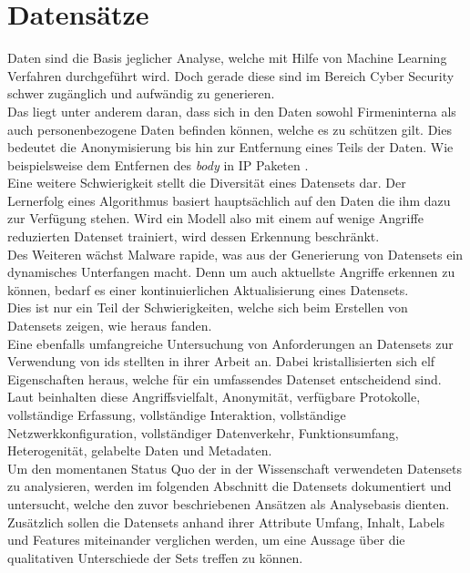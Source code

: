 \documentclass[
    12pt, %
    DIV10,
    ngerman, %
    a4paper, %
    oneside, %
    titlepage, %
    parskip=half, %
    headings=normal, %
    listof=totoc, %
    bibliography=totoc, %
    index=totoc, %
    captions=tableheading, %
    final %
]{scrreprt}
\begin{document}
\chapter{Datensätze}
Daten sind die Basis jeglicher Analyse, welche mit Hilfe von Machine Learning Verfahren durchgeführt wird. Doch gerade diese sind im Bereich Cyber Security schwer zugänglich und aufwändig zu generieren.\\ 
Das liegt unter anderem daran, dass sich in den Daten sowohl Firmeninterna als auch personenbezogene Daten befinden können, welche es zu schützen gilt. Dies bedeutet die Anonymisierung bis hin zur Entfernung eines Teils der Daten. Wie beispielsweise dem Entfernen des \emph{body} in IP Paketen \parencite{Uramova2018}.\\
Eine weitere Schwierigkeit stellt die Diversität eines Datensets dar. Der Lernerfolg eines Algorithmus basiert hauptsächlich auf den Daten die ihm dazu zur Verfügung stehen. Wird ein Modell also mit einem auf wenige Angriffe reduzierten Datenset trainiert, wird dessen Erkennung beschränkt.\\
Des Weiteren wächst Malware rapide, was aus der Generierung von Datensets ein dynamisches Unterfangen macht. Denn um auch aktuellste Angriffe erkennen zu können, bedarf es einer kontinuierlichen Aktualisierung eines Datensets.\\
Dies ist nur ein Teil der Schwierigkeiten, welche sich beim Erstellen von Datensets zeigen, wie \textcite{Uramova2018} heraus fanden.\\
Eine ebenfalls umfangreiche Untersuchung von Anforderungen an Datensets zur Verwendung von \ac{ids} stellten \textcite{7885840} in ihrer Arbeit an. Dabei kristallisierten sich elf  Eigenschaften heraus, welche für ein umfassendes Datenset entscheidend sind. Laut \citeauthor{7885840} beinhalten diese Angriffsvielfalt, Anonymität, verfügbare Protokolle, vollständige Erfassung,
vollständige Interaktion, vollständige Netzwerkkonfiguration, vollständiger Datenverkehr, Funktionsumfang, Heterogenität, gelabelte Daten und Metadaten.\\
Um den momentanen Status Quo der in der Wissenschaft verwendeten Datensets zu analysieren, werden im folgenden Abschnitt die Datensets dokumentiert und untersucht, welche den zuvor beschriebenen Ansätzen als Analysebasis dienten. Zusätzlich sollen die Datensets anhand ihrer Attribute Umfang, Inhalt, Labels und Features miteinander verglichen werden, um eine Aussage über die qualitativen Unterschiede der Sets treffen zu können.
\end{document}
